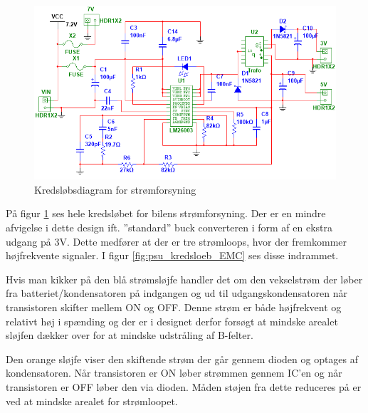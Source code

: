 \begin{landscape}
\begin{figure}
\centering
\includegraphics[height=\textwidth -3.2 cm]{../fig/diagrammer/bil/psu_kredsloeb}
\caption{Kredsløbsdiagram for strømforsyning}
\label{fig:psu_kredsloeb}
\end{figure}
\end{landscape}

\clearpage

På figur \ref{fig:psu_kredsloeb} ses hele kredsløbet for bilens strømforsyning. 
Der er en mindre afvigelse i dette design ift. ''standard'' buck converteren i form af en ekstra udgang på 3V.
Dette medfører at der er tre strømloops, hvor der fremkommer højfrekvente signaler.
I figur \ref{fig:psu_kredsloeb_EMC} ses disse indrammet.

Hvis man kikker på den blå strømsløjfe handler det om den vekselstrøm der løber fra batteriet/kondensatoren på indgangen og ud til udgangskondensatoren når transistoren skifter mellem ON og OFF. 
Denne strøm er både højfrekvent og relativt høj i spænding og der er i designet derfor forsøgt at mindske arealet sløjfen dækker over for at mindske udstråling af B-felter.

Den orange sløjfe viser den skiftende strøm der går gennem dioden og optages af kondensatoren.
Når transistoren er ON løber strømmen gennem IC'en og når transistoren er OFF løber den via dioden.
Måden støjen fra dette reduceres på er ved at mindske arealet for strømloopet.

